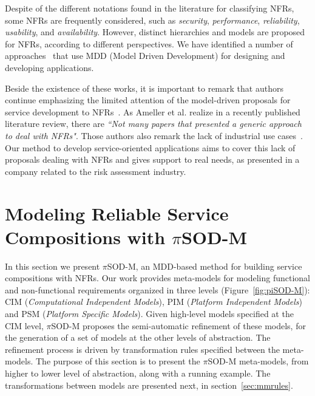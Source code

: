 \documentclass{singlecol-new}
\theoremstyle{TH}{
\newtheorem{lemma}{Lemma}
\newtheorem{theorem}[lemma]{Theorem}
\newtheorem{corrolary}[lemma]{Corrolary}
\newtheorem{conjecture}[lemma]{Conjecture}
\newtheorem{proposition}[lemma]{Proposition}
\newtheorem{claim}[lemma]{Claim}
\newtheorem{stheorem}[lemma]{Wrong Theorem}
\newtheorem{algorithm}{Algorithm}
}
\theoremstyle{THrm}{
\newtheorem{definition}{Definition}[section]
\newtheorem{question}{Question}[section]
\newtheorem{remark}{Remark}
\newtheorem{scheme}{Scheme}
}
\theoremstyle{THhit}{
\newtheorem{case}{Case}[section]
}
\theoremstyle{THhsl}{
\newtheorem{example}{Example}
}
\newcommand{\pisodm}[0]{$\pi$SOD-M\xspace}
\begin{document}
Despite of the different notations found in the literature for classifying NFRs, some NFRs are frequently considered, such as \textit{security}, \textit{performance}, \textit{reliability}, \textit{usability}, and \textit{availability}.
However, distinct hierarchies and models are proposed for NFRs, according to different perspectives.
We have identified a number of approaches~\cite{DAmbrogio06,CholletL09,SchmelingCM11,BasinDL06,Fabra2011,OvaskaEHPA10} that use MDD (Model Driven Development) for designing and developing applications.

Beside the existence of these works, it is important to remark that authors continue emphasizing the limited attention of the model-driven proposals for service development to NFRs~\cite{Ameller201542,Ameller2010}.%
As Ameller et al. realize in a recently published literature review, there are \textit{``Not many papers that presented a generic approach to deal with NFRs"}. Those authors also remark the lack of industrial use cases~\cite{Ameller201542}. 
Our method to develop service-oriented applications aims to cover this lack of proposals dealing with NFRs and gives support to real needs, as presented in a company related to the risk assessment industry.


\section{Modeling Reliable Service Compositions with \pisodm}\label{sec:motivation}

In this section we present \pisodm, an MDD-based method for building service compositions with NFRs.
Our work provides meta-models for modeling functional and non-functional requirements organized in three levels (Figure~\ref{fig:piSOD-M}): CIM (\textit{Computational Independent Models}), PIM (\textit{Plat\-form Independent Models}) and PSM (\textit{Platform Specific Models}).
Given  high-level models specified at the CIM level, \pisodm proposes the semi-automatic refinement of these models, for the generation of a set of models at the other levels of abstraction.
The refinement process is driven by transformation rules specified between the meta-models.
%
The purpose of this section is to present the \pisodm me\-ta-models, from higher to lower level of abstraction, along with a running example.
The transformations between models are presented next, in section~\ref{sec:mmrules}.
\end{document}
